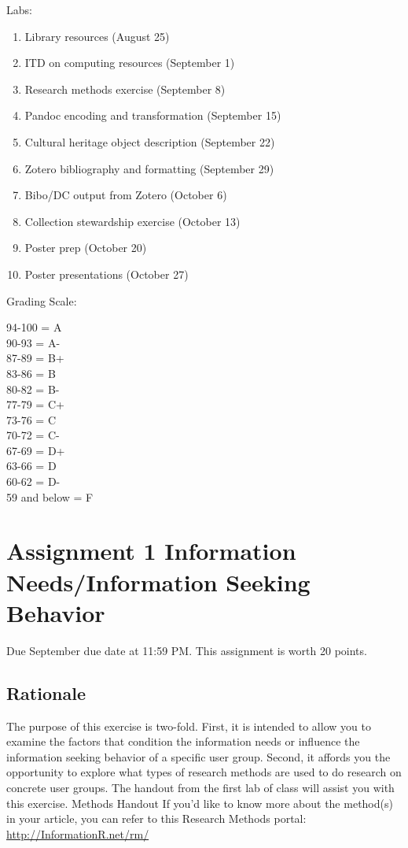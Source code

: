 \documentclass[]{article}
\providecommand{\tightlist}{%
  \setlength{\itemsep}{0pt}\setlength{\parskip}{0pt}}
\begin{document}
Labs:

\begin{enumerate}
\def\labelenumi{\arabic{enumi}.}
\tightlist
\item
  Library resources (August 25)
\item
  ITD on computing resources (September 1)
\item
  Research methods exercise (September 8)
\item
  Pandoc encoding and transformation (September 15)
\item
  Cultural heritage object description (September 22)
\item
  Zotero bibliography and formatting (September 29)
\item
  Bibo/DC output from Zotero (October 6)
\item
  Collection stewardship exercise (October 13)
\item
  Poster prep (October 20)
\item
  Poster presentations (October 27)
\end{enumerate}

Grading Scale:

94-100 = A\\
90-93 = A-\\
87-89 = B+\\
83-86 = B\\
80-82 = B-\\
77-79 = C+\\
73-76 = C\\
70-72 = C-\\
67-69 = D+\\
63-66 = D\\
60-62 = D-\\
59 and below = F

\section{Assignment 1 Information Needs/Information Seeking
Behavior}\label{Asgt1}

Due September due date at 11:59 PM. This assignment is worth 20 points.

\subsection{Rationale}\label{rationale}

The purpose of this exercise is two-fold. First, it is intended to allow
you to examine the factors that condition the information needs or
influence the information seeking behavior of a specific user group.
Second, it affords you the opportunity to explore what types of research
methods are used to do research on concrete user groups. The handout
from the first lab of class will assist you with this exercise. Methods
Handout If you'd like to know more about the method(s) in your article,
you can refer to this Research Methods portal:
\url{http://InformationR.net/rm/}
\end{document}

